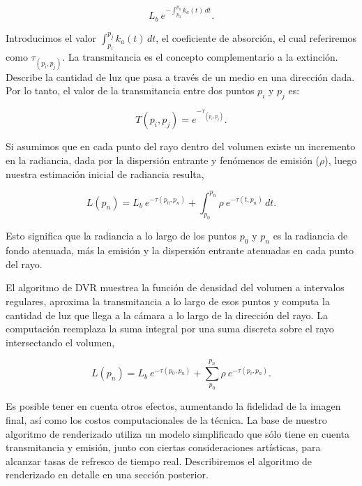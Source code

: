 \begin{equation} \label{eq:radiance_absorption}  
    L_b \ e^{- \textstyle  \int_{p_0}^{p_n} k_a(t) \, dt}.
\end{equation}

Introducimos el valor $\int_{p_i}^{p_j} k_a(t) \, dt$, el coeficiente de absorción, el cual referiremos como $\tau_{(p_i, p_j)}$. 
La transmitancia es el concepto complementario a la extinción. Describe la cantidad de luz que pasa a través de un medio en una dirección dada.
Por lo tanto, el valor de la transmitancia entre dos puntos $p_i$ y $p_j$ es:

\begin{equation} \label{eq:transmittance}  
  T(p_i,p_j) = e^{- \textstyle \tau_{(p_i, p_j)}}.
\end{equation}

Si asumimos que en cada punto del rayo dentro del volumen existe un incremento en la radiancia, dada por la dispersión entrante y fenómenos de emisión ($\rho$), luego nuestra estimación inicial de radiancia resulta,

\begin{equation} \label{eq:ray_radiance}  
  L(p_n) = L_b \ e^{-\tau(p_0, p_n)} + \int_{p_0}^{p_n} \rho \ e^{-\tau(t,p_n)} \, dt.
\end{equation}

Esto significa que la radiancia a lo largo de los puntos $p_0$ y $p_n$ es la radiancia de fondo atenuada, más la emisión y la dispersión entrante atenuadas en cada punto del rayo.

El algoritmo de DVR muestrea la función de densidad del volumen a intervalos regulares, aproxima la transmitancia a lo largo de esos puntos y computa la cantidad de luz que llega a la cámara a lo largo de la dirección del rayo.
La computación reemplaza la suma integral por una suma discreta sobre el rayo intersectando el volumen,

\begin{equation} \label{eq:ray_radiance}  
  L(p_n) = L_b \ e^{-\tau(p_0, p_n)} + \sum_{p_0}^{p_n} \rho \ e^{-\tau(p_i,p_n)}.
\end{equation}

Es posible tener en cuenta otros efectos, aumentando la fidelidad de la imagen final, así como los costos computacionales de la técnica.
La base de nuestro algoritmo de renderizado utiliza un modelo simplificado que sólo tiene en cuenta transmitancia y emisión, junto con ciertas consideraciones artísticas, para alcanzar tasas de refresco de tiempo real.
Describiremos el algoritmo de renderizado en detalle en una sección posterior.

